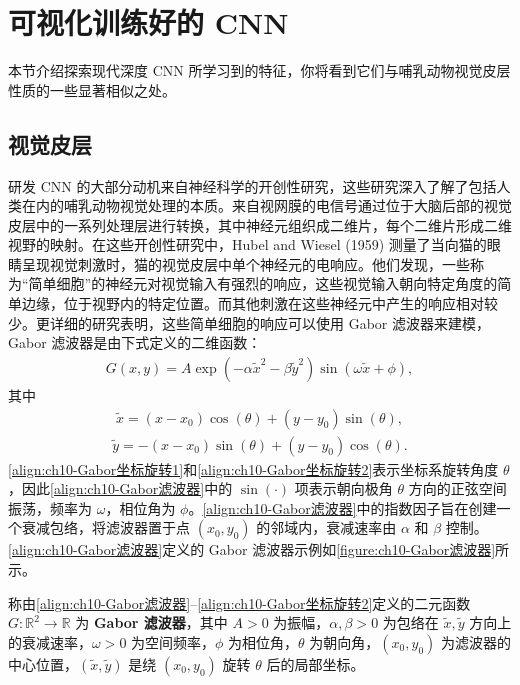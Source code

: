 \documentclass[../../main.tex]{subfiles}
\begin{document}
\section{可视化训练好的 CNN}\label{section:ch10-可视化训练好的CNN}

本节介绍探索现代深度 CNN 所学习到的特征，你将看到它们与哺乳动物视觉皮层性质的一些显著相似之处。

\subsection{视觉皮层}\label{subsection:ch10-视觉皮层}

研发 CNN 的大部分动机来自神经科学的开创性研究，这些研究深入了解了包括人类在内的哺乳动物视觉处理的本质。来自视网膜的电信号通过位于大脑后部的视觉皮层中的一系列处理层进行转换，其中神经元组织成二维片，每个二维片形成二维视野的映射。在这些开创性研究中，Hubel and Wiesel (1959) 测量了当向猫的眼睛呈现视觉刺激时，猫的视觉皮层中单个神经元的电响应。他们发现，一些称为“简单细胞”的神经元对视觉输入有强烈的响应，这些视觉输入朝向特定角度的简单边缘，位于视野内的特定位置。而其他刺激在这些神经元中产生的响应相对较少。更详细的研究表明，这些简单细胞的响应可以使用 Gabor 滤波器来建模，Gabor 滤波器是由下式定义的二维函数：
\begin{align}
  G(x,y) = A\exp\left(-\alpha\tilde{x}^2-\beta\tilde{y}^2\right)\sin\left(\omega\tilde{x}+\phi\right),
  \label{align:ch10-Gabor滤波器}
\end{align}
其中
\begin{align}
  \tilde{x} = (x-x_0)\cos(\theta)+(y-y_0)\sin(\theta),
  \label{align:ch10-Gabor坐标旋转1}
\end{align}
\begin{align}
  \tilde{y} = -(x-x_0)\sin(\theta)+(y-y_0)\cos(\theta).
  \label{align:ch10-Gabor坐标旋转2}
\end{align}
\eqref{align:ch10-Gabor坐标旋转1}和\eqref{align:ch10-Gabor坐标旋转2}表示坐标系旋转角度 $\theta$，因此\eqref{align:ch10-Gabor滤波器}中的 $\sin(\cdot)$ 项表示朝向极角 $\theta$ 方向的正弦空间振荡，频率为 $\omega$，相位角为 $\phi$。\eqref{align:ch10-Gabor滤波器}中的指数因子旨在创建一个衰减包络，将滤波器置于点 $(x_0,y_0)$ 的邻域内，衰减速率由 $\alpha$ 和 $\beta$ 控制。\eqref{align:ch10-Gabor滤波器}定义的 Gabor 滤波器示例如\cref{figure:ch10-Gabor滤波器}所示。

\begin{definition}\label{definition:ch10-Gabor滤波器}
称由\eqref{align:ch10-Gabor滤波器}--\eqref{align:ch10-Gabor坐标旋转2}定义的二元函数 $G:\mathbb{R}^2\to\mathbb{R}$ 为 \textbf{Gabor 滤波器}，其中 $A>0$ 为振幅，$\alpha,\beta>0$ 为包络在 $\tilde{x},\tilde{y}$ 方向上的衰减速率，$\omega>0$ 为空间频率，$\phi$ 为相位角，$\theta$ 为朝向角，$(x_0,y_0)$ 为滤波器的中心位置，$(\tilde{x},\tilde{y})$ 是绕 $(x_0,y_0)$ 旋转 $\theta$ 后的局部坐标。
\end{definition}
\end{document}
